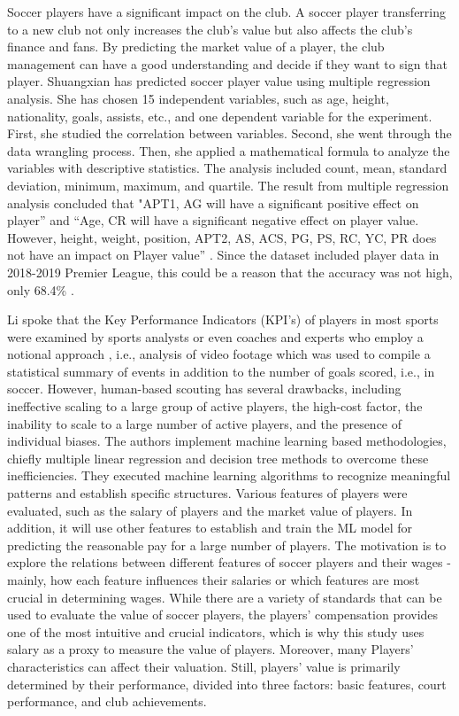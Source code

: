 \documentclass[conference]{IEEEtran}
\begin{document}
Soccer players have a significant impact on the club. A soccer player transferring to a new club not only increases the club's value but also affects the club's finance and fans. By predicting the market value of a player, the club management can have a good understanding and decide if they want to sign that player. Shuangxian has predicted soccer player value using multiple regression analysis.\cite{b1} She has chosen 15 independent variables, such as age, height, nationality, goals, assists, etc., and one dependent variable for the experiment. First, she studied the correlation between variables. Second, she went through the data wrangling process. Then, she applied a mathematical formula to analyze the variables with descriptive statistics. The analysis included count, mean, standard deviation, minimum, maximum, and quartile. The result from multiple regression analysis concluded that "APT1, AG will have a significant positive effect on player” \cite{b1} and “Age, CR will have a significant negative effect on player value. However, height, weight, position, APT2, AS, ACS, PG, PS, RC, YC, PR does not have an impact on Player value” \cite{b1}. Since the dataset included player data in 2018-2019 Premier League, this could be a reason that the accuracy was not high, only 68.4\% \cite{b1}. \par
Li spoke that the Key Performance Indicators (KPI's) of players in most sports were examined by sports analysts or even coaches and experts who employ a notional approach \cite{b2}, i.e., analysis of video footage which was used to compile a statistical summary of events in addition to the number of goals scored, i.e., in soccer. However, human-based scouting has several drawbacks, including ineffective scaling to a large group of active players, the high-cost factor, the inability to scale to a large number of active players, and the presence of individual biases. The authors implement machine learning based methodologies, chiefly multiple linear regression and decision tree methods to overcome these inefficiencies. They executed machine learning algorithms to recognize meaningful patterns and establish specific structures. Various features of players were evaluated, such as the salary of players and the market value of players. In addition, it will use other features to establish and train the ML model for predicting the reasonable pay for a large number of players. The motivation is to explore the relations between different features of soccer players and their wages - mainly, how each feature influences their salaries or which features are most crucial in determining wages. While there are a variety of standards that can be used to evaluate the value of soccer players, the players' compensation provides one of the most intuitive and crucial indicators, which is why this study uses salary as a proxy to measure the value of players. Moreover, many Players' characteristics can affect their valuation. Still, players' value is primarily determined by their performance, divided into three factors: basic features, court performance, and club achievements.\par
\end{document}
